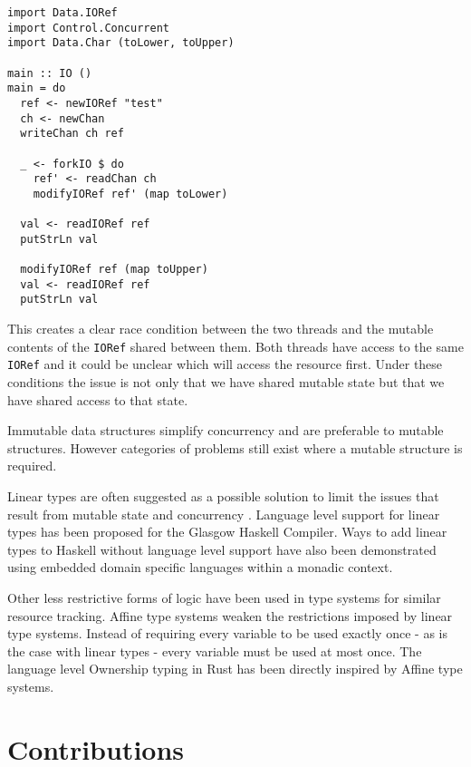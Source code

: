 \documentclass[onehalf,11pt]{beavtex}
\begin{document}
\begin{verbatim}
import Data.IORef
import Control.Concurrent
import Data.Char (toLower, toUpper)

main :: IO ()
main = do
  ref <- newIORef "test"
  ch <- newChan
  writeChan ch ref

  _ <- forkIO $ do
    ref' <- readChan ch
    modifyIORef ref' (map toLower)

  val <- readIORef ref
  putStrLn val

  modifyIORef ref (map toUpper)
  val <- readIORef ref
  putStrLn val
\end{verbatim}

This creates a clear race condition between the two threads and the mutable
contents of the \texttt{IORef} shared between them. Both threads have access
to the same \texttt{IORef} and it could be unclear which will access the
resource first. Under these conditions the issue is not only that we have
shared mutable state but that we have shared access to that state.

Immutable data structures simplify concurrency and are preferable to
mutable structures. However categories of problems still exist where a
mutable structure is required.

Linear types are often suggested as a possible solution to limit the issues that
result from mutable state \cite{Wadler90lineartypes} and concurrency
\cite{caires2010session}.  Language level support for linear types has been
proposed for the Glasgow Haskell Compiler. \cite{LinearTypesGHC}
Ways to add linear types to Haskell without language level support have also
been demonstrated using embedded domain specific languages within a monadic
context. \cite{Paykin:2017:LM:3122955.3122965}

Other less restrictive forms of logic have been used in type systems for similar
resource tracking.
Affine type systems weaken the restrictions imposed by linear type systems.
Instead of requiring every variable to be used exactly once - as is the case
with linear types - every variable must be used at most once.
The language level Ownership typing in Rust has been directly inspired by Affine
type systems. %

\section{Contributions}
\end{document}

